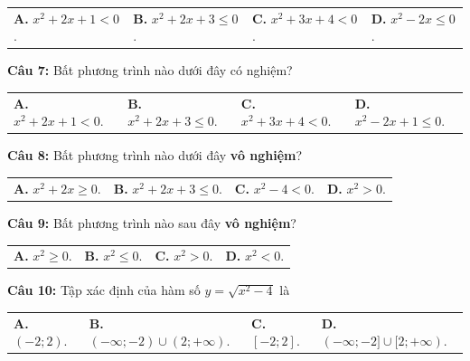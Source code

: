 \documentclass[12pt,a4paper]{extarticle}
\begin{document}
\begin{center}
\begin{tabular}{p{3.5cm} p{3.5cm} p{3.5cm} p{3.5cm}}
\textbf{A.} $x^2+2x+1<0$. & \textbf{B.} $x^2+2x+3\le 0$. & \textbf{C.} $x^2+3x+4<0$. & \textbf{D.} $x^2-2x\le 0$.
\end{tabular}
\end{center}
\noindent\textbf{Câu 7:} Bất phương trình nào dưới đây có nghiệm?
\begin{center}
\begin{tabular}{p{3.5cm} p{3.5cm} p{3.5cm} p{3.5cm}}
\textbf{A.} $x^2+2x+1<0$. & \textbf{B.} $x^2+2x+3\le 0$. & \textbf{C.} $x^2+3x+4<0$. & \textbf{D.} $x^2-2x+1\le 0$.
\end{tabular}
\end{center}
\noindent\textbf{Câu 8:} Bất phương trình nào dưới đây \textbf{vô nghiệm}?
\begin{center}
\begin{tabular}{p{3.5cm} p{3.5cm} p{3.5cm} p{3.5cm}}
\textbf{A.} $x^2 + 2x \ge 0$. & \textbf{B.} $x^2 + 2x + 3 \le 0$. & \textbf{C.} $x^2 - 4 < 0$. & \textbf{D.} $x^2 > 0$.
\end{tabular}
\end{center}
\noindent\textbf{Câu 9:} Bất phương trình nào sau đây \textbf{vô nghiệm}?
\begin{center}
\begin{tabular}{p{3.5cm} p{3.5cm} p{3.5cm} p{3.5cm}}
\textbf{A.} $x^2 \ge 0$. & \textbf{B.} $x^2 \le 0$. & \textbf{C.} $x^2 > 0$. & \textbf{D.} $x^2 < 0$.
\end{tabular}
\end{center}
\noindent\textbf{Câu 10:} Tập xác định của hàm số $y=\sqrt{x^2-4}$ là
\begin{center}
\begin{tabular}{p{3.5cm} p{4.5cm} p{3.5cm} p{4.5cm}}
\textbf{A.} $(-2;2)$. & \textbf{B.} $(-\infty;-2) \cup (2;+\infty)$. & \textbf{C.} $[-2;2]$. & \textbf{D.} $(-\infty;-2] \cup [2;+\infty)$.
\end{tabular}
\end{center}
\end{document}
